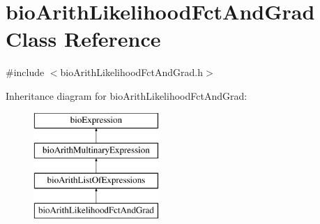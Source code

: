 \hypertarget{classbio_arith_likelihood_fct_and_grad}{}\section{bio\+Arith\+Likelihood\+Fct\+And\+Grad Class Reference}
\label{classbio_arith_likelihood_fct_and_grad}


{\ttfamily \#include $<$bio\+Arith\+Likelihood\+Fct\+And\+Grad.\+h$>$}

Inheritance diagram for bio\+Arith\+Likelihood\+Fct\+And\+Grad\+:\begin{figure}[H]
\begin{center}
\leavevmode
\includegraphics[height=4.000000cm]{classbio_arith_likelihood_fct_and_grad}
\end{center}
\end{figure}
